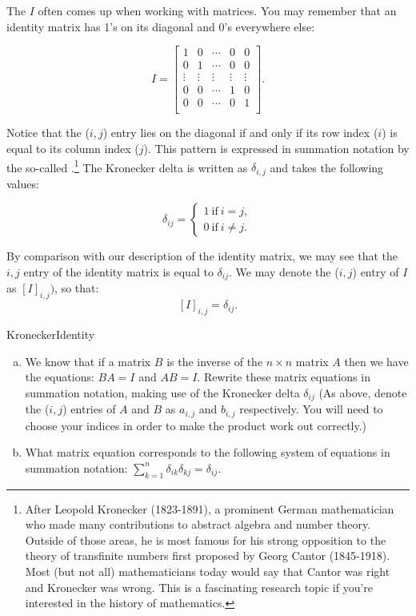 The  $I$ often comes up when working with matrices. You may remember that an identity matrix has 1's on its diagonal and 0's everywhere else:

\[I = \left[ \begin{array}{ccccc}
1 & 0  & \cdots & 0 & 0 \\
0 & 1  & \cdots & 0 & 0  \\
\vdots & \vdots & \vdots & \vdots & \vdots\\
0 & 0  & \cdots & 1 & 0  \\
0 & 0  & \cdots & 0 & 1  \\
 \end{array} \right]. \]

Notice that the ($i,j$) entry lies on the diagonal if and only if its row index ($i$) is equal to its column index ($j$).  This pattern is expressed in summation notation  by the so-called  
 .\footnote{After Leopold Kronecker (1823-1891), a prominent German mathematician who made many contributions to abstract algebra and number theory. Outside of those areas, he is most famous for his strong opposition to the theory of transfinite numbers first proposed by Georg Cantor (1845-1918).  Most (but not all) mathematicians today would say that Cantor was right and Kronecker was wrong. This is a fascinating research topic if you're interested in the history of mathematics.} The Kronecker delta is written as $\delta_{i,j}$ and takes the following values:

\[ \delta_{ij}=
\begin{cases}
1 ~ \text{if} ~ i=j,  \\
0 ~ \text{if} ~ i \neq j.
\end{cases} \]

By comparison with our description of the identity matrix, we may see that the $i,j$ entry of the identity matrix is equal to $\delta_{ij}$. We may denote the ($i,j$) entry of $I$ as $[I]_{i,j})$, so that:
\[  [I]_{i,j} = \delta_{ij}.\]

\begin{exercise}{KroneckerIdentity}
\begin{enumerate}[(a)]
\item
We know that if a matrix $B$ is the inverse of the $n \times n$ matrix $A$ then we have the equations: $BA = I$ and $AB = I$.  Rewrite these matrix equations in summation notation, making use of the Kronecker delta $\delta_{ij}$ (As above, denote the ($i,j$) entries of $A$ and $B$ as $a_{i,j}$ and $b_{i,j}$ respectively. You will need to choose your indices in order to make the product work out correctly.) 
\item
What matrix equation corresponds to the following system of equations in summation notation: $\displaystyle{ \sum_{k=1}^n  \delta_{ik}\delta_{kj}=\delta_{ij}}.$
\end{enumerate}
\end{exercise}


